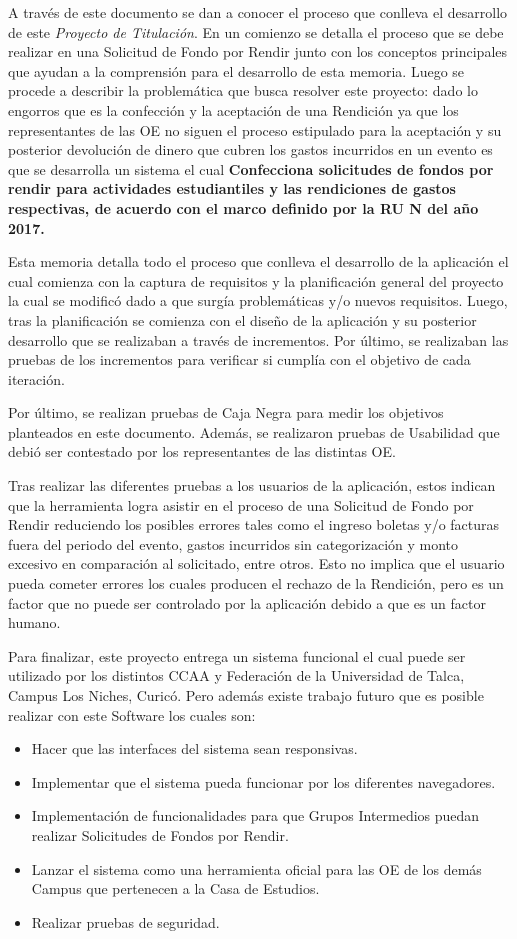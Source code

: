 A través de este documento se dan a conocer el proceso que conlleva el desarrollo de este \textit{Proyecto de Titulación}. En un comienzo se detalla el proceso que se debe realizar en una Solicitud de Fondo por Rendir junto con los conceptos principales que ayudan a la comprensión para el desarrollo de esta memoria. Luego se procede a describir la problemática que busca resolver este proyecto: dado lo engorros que es la confección y la aceptación de una Rendición ya que los representantes de las OE no siguen el proceso estipulado para la aceptación y su posterior devolución de dinero que cubren los gastos  incurridos en un evento es que se desarrolla un sistema el cual \textbf{Confecciona solicitudes de fondos por rendir para actividades estudiantiles y las rendiciones de gastos respectivas, de acuerdo con el marco definido por la RU N del año 2017.}

Esta memoria detalla todo el proceso que conlleva el desarrollo de la aplicación el cual comienza con la captura de requisitos y la planificación general del proyecto la cual se modificó dado a que surgía problemáticas y/o nuevos requisitos. Luego, tras la planificación se comienza con el diseño de la aplicación y su posterior desarrollo que se realizaban a través de incrementos. Por último, se realizaban las pruebas de los incrementos para verificar si cumplía con el objetivo de cada iteración.

Por último, se realizan pruebas de Caja Negra para medir los objetivos planteados en este documento. Además, se realizaron pruebas de Usabilidad que debió ser contestado por los representantes de las distintas OE.

Tras realizar las diferentes pruebas a los usuarios de la aplicación, estos indican que la herramienta logra asistir en el proceso de una Solicitud de Fondo por Rendir reduciendo los posibles errores tales como el ingreso boletas y/o facturas fuera del periodo del evento, gastos incurridos sin categorización y monto excesivo en comparación al solicitado, entre otros. Esto no implica que el usuario pueda cometer errores los cuales producen el rechazo de la Rendición, pero es un factor que no puede ser controlado por la aplicación debido a que es un factor humano. 

Para finalizar, este proyecto entrega un sistema funcional el cual puede ser utilizado por los distintos CCAA y Federación de la Universidad de Talca, Campus Los Niches, Curicó. Pero además existe trabajo futuro que es posible realizar con este Software los cuales son:

\begin{itemize}
    \item Hacer que las interfaces del sistema sean responsivas.
    \item Implementar que el sistema pueda funcionar por los diferentes navegadores.
    \item Implementación de funcionalidades para que Grupos Intermedios puedan realizar Solicitudes de Fondos por Rendir.
    \item Lanzar el sistema como una herramienta oficial para las OE de los demás Campus que pertenecen a la Casa de Estudios.
    \item Realizar pruebas de seguridad.
\end{itemize}
